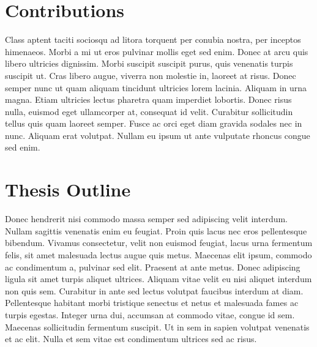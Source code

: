 \section{Contributions}\label{chap:introduction:contributions}

Class aptent taciti sociosqu ad litora torquent per conubia nostra, per inceptos himenaeos. Morbi a mi ut eros pulvinar mollis eget sed enim. Donec at arcu quis libero ultricies dignissim. Morbi suscipit suscipit purus, quis venenatis turpis suscipit ut. Cras libero augue, viverra non molestie in, laoreet at risus. Donec semper nunc ut quam aliquam tincidunt ultricies lorem lacinia. Aliquam in urna magna. Etiam ultricies lectus pharetra quam imperdiet lobortis. Donec risus nulla, euismod eget ullamcorper at, consequat id velit. Curabitur sollicitudin tellus quis quam laoreet semper. Fusce ac orci eget diam gravida sodales nec in nunc. Aliquam erat volutpat. Nullam eu ipsum ut ante vulputate rhoncus congue sed enim.

\section{Thesis Outline}\label{chap:introduction:outline}

Donec hendrerit nisi commodo massa semper sed adipiscing velit interdum. Nullam sagittis venenatis enim eu feugiat. Proin quis lacus nec eros pellentesque bibendum. Vivamus consectetur, velit non euismod feugiat, lacus urna fermentum felis, sit amet malesuada lectus augue quis metus. Maecenas elit ipsum, commodo ac condimentum a, pulvinar sed elit. Praesent at ante metus. Donec adipiscing ligula sit amet turpis aliquet ultrices. Aliquam vitae velit eu nisi aliquet interdum non quis sem. Curabitur in ante sed lectus volutpat faucibus interdum at diam. Pellentesque habitant morbi tristique senectus et netus et malesuada fames ac turpis egestas. Integer urna dui, accumsan at commodo vitae, congue id sem. Maecenas sollicitudin fermentum suscipit. Ut in sem in sapien volutpat venenatis et ac elit. Nulla et sem vitae est condimentum ultrices sed ac risus.